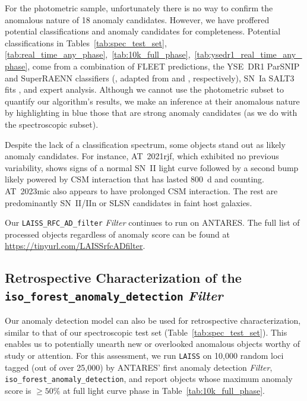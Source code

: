 \documentclass[twocolumn]{aastex63}
\newcommand{\laiss}{\texttt{LAISS}}
\begin{document}
For the photometric sample, unfortunately there is no way to confirm the anomalous nature of 18 anomaly candidates. However, we have proffered potential classifications and anomaly candidates for completeness. Potential classifications in Tables~\ref{tab:spec_test_set}, \ref{tab:real_time_any_phase},~\ref{tab:10k_full_phase},~\ref{tab:ysedr1_real_time_any_phase}, come from a combination of FLEET \citep{Gomez2020} predictions, the YSE~DR1 ParSNIP and SuperRAENN classifiers (\citealt{Aleo2023}, adapted from \cite{Boone2021} and \cite{Villar2020}, respectively), SN~Ia SALT3 fits \citep{Kenworthy2021}, and expert analysis. Although we cannot use the photometric subset to quantify our algorithm's results, we make an inference at their anomalous nature by highlighting in blue those that are strong anomaly candidates (as we do with the spectroscopic subset). \par

Despite the lack of a classification spectrum, some objects stand out as likely anomaly candidates. For instance, AT~2021rjf, which exhibited no previous variability, shows signs of a normal SN~II light curve followed by a second bump likely powered by CSM interaction that has lasted 800~d and counting. AT~2023mic also appears to have prolonged CSM interaction. The rest are predominantly SN~II/IIn or SLSN candidates in faint host galaxies. \par

Our \texttt{LAISS\_RFC\_AD\_filter} \emph{Filter} continues to run on ANTARES. The full list of processed objects regardless of anomaly score can be found at \url{https://tinyurl.com/LAISSrfcADfilter}. \par



\subsection{Retrospective Characterization of the \texttt{iso\_forest\_anomaly\_detection} \emph{Filter}} \label{subsec:iso_forest_ad_filter}

Our anomaly detection model can also be used for retrospective characterization, similar to that of our spectroscopic test set (Table~\ref{tab:spec_test_set}). This enables us to potentially unearth new or overlooked anomalous objects worthy of study or attention. For this assessment, we run \laiss{} on 10,000 random loci tagged (out of over 25,000) by ANTARES' first anomaly detection \emph{Filter}, \texttt{iso\_forest\_anomaly\_detection}, and report objects whose maximum anomaly score is $\geq50\%$ at full light curve phase in Table~\ref{tab:10k_full_phase}. \par
\end{document}
